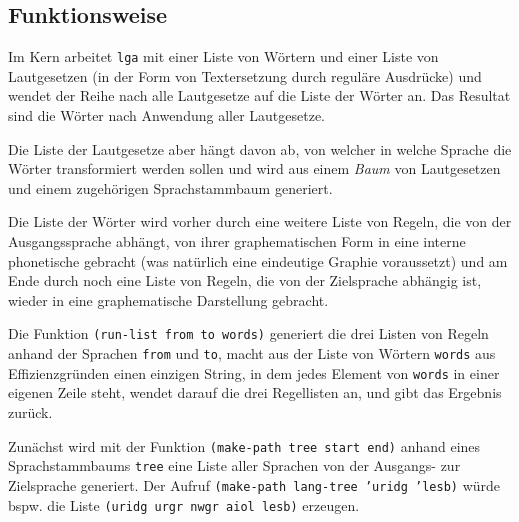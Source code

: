 \documentclass[12pt,a4paper,normalheadings]{scrartcl}
\def\tt#1{\texttt{#1}}
\begin{document}
\subsection{Funktionsweise}

Im Kern arbeitet \tt{lga} mit einer Liste von Wörtern
und einer Liste von Lautgesetzen
(in der Form von Textersetzung durch reguläre Ausdrücke)
und wendet der Reihe nach alle Lautgesetze auf die Liste der Wörter an.
Das Resultat sind die Wörter nach Anwendung aller Lautgesetze.

Die Liste der Lautgesetze aber hängt davon ab,
von welcher in welche Sprache die Wörter transformiert werden sollen
und wird aus einem \emph{Baum} von Lautgesetzen und einem
zugehörigen Sprachstammbaum generiert.

Die Liste der Wörter wird vorher durch eine weitere Liste von Regeln,
die von der Ausgangssprache abhängt,
von ihrer graphematischen Form in eine interne phonetische gebracht
(was natürlich eine eindeutige Graphie voraussetzt)
und am Ende durch noch eine Liste von Regeln,
die von der Zielsprache abhängig ist,
wieder in eine graphematische Darstellung gebracht.

Die Funktion \tt{(run-list from to words)}
generiert die drei Listen von Regeln anhand der Sprachen \tt{from} und \tt{to},
macht aus der Liste von Wörtern \tt{words} aus Effizienzgründen einen
einzigen String,
in dem jedes Element von \tt{words} in einer eigenen Zeile steht,
wendet darauf die drei Regellisten an,
und gibt das Ergebnis zurück.

Zunächst wird mit der Funktion \tt{(make-path tree start end)} anhand
eines Sprachstammbaums \tt{tree}
eine Liste aller Sprachen von der Ausgangs- zur Zielsprache generiert.
Der Aufruf \tt{(make-path lang-tree 'uridg 'lesb)} würde bspw.
die Liste \tt{(uridg urgr nwgr aiol lesb)} erzeugen.
\end{document}

